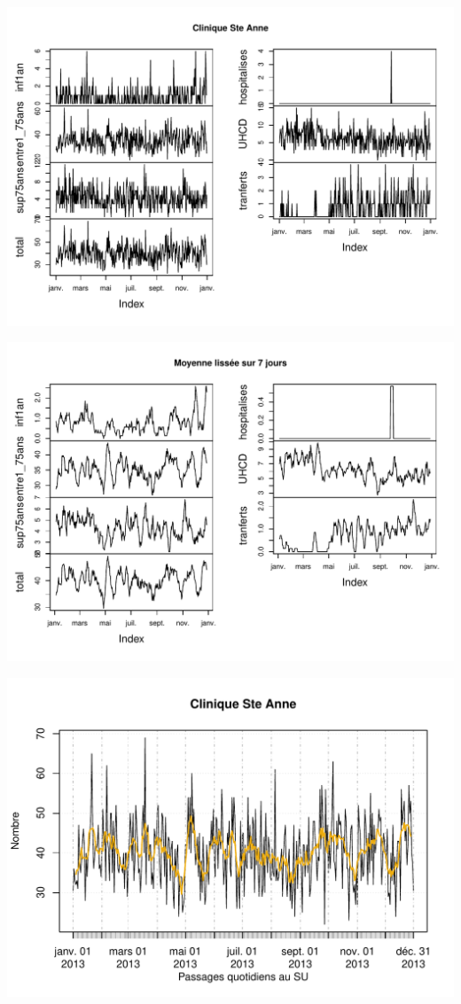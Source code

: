 \documentclass[12pt,english,french,twoside]{book}\usepackage[]{graphicx}\usepackage[]{color}
\makeatletter
\def\maxwidth{ %
  \ifdim\Gin@nat@width>\linewidth
    \linewidth
  \else
    \Gin@nat@width
  \fi
}
\newenvironment{knitrout}{}{} %
\makeatother
\begin{document}
\begin{knitrout}
\color{fgcolor}
\includegraphics[width=\maxwidth]{figure/stAnne_tx_moyen_passages-1} 

\includegraphics[width=\maxwidth]{figure/stAnne_tx_moyen_passages-2} 

\includegraphics[width=\maxwidth]{figure/stAnne_tx_moyen_passages-3} 

\end{knitrout}
\end{document}

